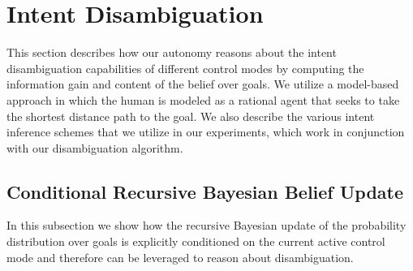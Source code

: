 \documentclass[letterpaper, 10 pt, conference]{ieeeconf}  %
\begin{document}
\section{Intent Disambiguation}\label{sec:disamb}
This section describes how our autonomy reasons about the intent disambiguation capabilities of different control modes by computing the information gain and content of the belief over goals. We utilize a model-based approach in which the human is modeled as a rational agent that seeks to take the shortest distance path to the goal. 
We also describe the various intent inference schemes that we utilize in our experiments, which work in conjunction with our disambiguation algorithm. 


\subsection{Conditional Recursive Bayesian Belief Update}

In this subsection we show how the recursive Bayesian update of the probability distribution over goals is explicitly conditioned on the current active control mode and therefore can be leveraged to reason about disambiguation.
\end{document}

